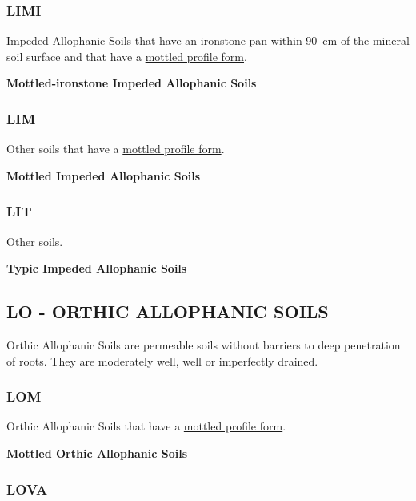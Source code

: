 \documentclass[
  letterpaper,
  DIV=11,
  numbers=noendperiod]{scrreprt}
\begin{document}
\hypertarget{sec-key-LIMI}{%
\subsubsection{\texorpdfstring{\textbf{LIMI}}{LIMI}}\label{sec-key-LIMI}}

Impeded Allophanic Soils that have an ironstone-pan within 90~cm of the
mineral soil surface and that have a
\protect\hyperlink{sec-diag-mottpf}{mottled profile form}.

\textbf{Mottled-ironstone Impeded Allophanic Soils}

\hypertarget{sec-key-LIM}{%
\subsubsection{\texorpdfstring{\textbf{LIM}}{LIM}}\label{sec-key-LIM}}

Other soils that have a \protect\hyperlink{sec-diag-mottpf}{mottled
profile form}.

\textbf{Mottled Impeded Allophanic Soils}

\hypertarget{sec-key-LIT}{%
\subsubsection{\texorpdfstring{\textbf{LIT}}{LIT}}\label{sec-key-LIT}}

Other soils.

\textbf{Typic Impeded Allophanic Soils}

\hypertarget{sec-LO}{%
\subsection{\texorpdfstring{\textbf{LO} - ORTHIC ALLOPHANIC
SOILS}{LO - ORTHIC ALLOPHANIC SOILS}}\label{sec-LO}}

Orthic Allophanic Soils are permeable soils without barriers to deep
penetration of roots. They are moderately well, well or imperfectly
drained.

\hypertarget{sec-key-LOM}{%
\subsubsection{\texorpdfstring{\textbf{LOM}}{LOM}}\label{sec-key-LOM}}

Orthic Allophanic Soils that have a
\protect\hyperlink{sec-diag-mottpf}{mottled profile form}.

\textbf{Mottled Orthic Allophanic Soils}

\hypertarget{sec-key-LOVA}{%
\subsubsection{\texorpdfstring{\textbf{LOVA}}{LOVA}}\label{sec-key-LOVA}}
\end{document}
